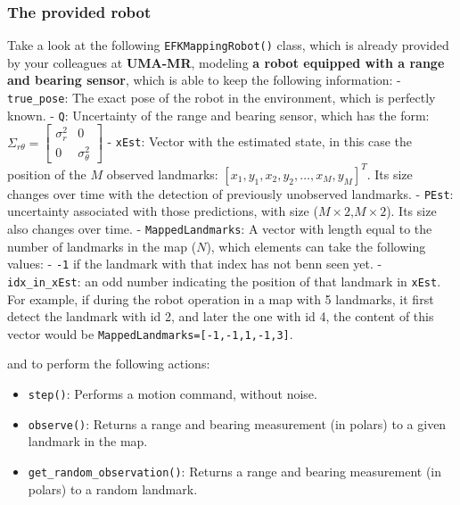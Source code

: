 \documentclass[11pt]{article}
\providecommand{\tightlist}{%
      \setlength{\itemsep}{0pt}\setlength{\parskip}{0pt}}
\begin{document}
    \hypertarget{the-provided-robot}{%
\subsubsection{The provided robot}\label{the-provided-robot}}

Take a look at the following \texttt{EFKMappingRobot()} class, which is
already provided by your colleagues at \textbf{{UMA-MR}}, modeling
\textbf{a robot equipped with a range and bearing sensor}, which is able
to keep the following information: - \texttt{true\_pose}: The exact pose
of the robot in the environment, which is perfectly known. - \texttt{Q}:
Uncertainty of the range and bearing sensor, which has the form:
\(\Sigma_{r\theta} = \begin{bmatrix} \sigma^2_r & 0 \\ 0 & \sigma^2_\theta \end{bmatrix}\)
- \texttt{xEst}: Vector with the estimated state, in this case the
position of the \(M\) observed landmarks:
\([x_1, y_1, x_2, y_2, \dots,x_M, y_M]^T\). Its size changes over time
with the detection of previously unobserved landmarks. - \texttt{PEst}:
uncertainty associated with those predictions, with size
(\(M\times2\),\(M\times2\)). Its size also changes over time. -
\texttt{MappedLandmarks}: A vector with length equal to the number of
landmarks in the map (\(N\)), which elements can take the following
values: - \texttt{-1} if the landmark with that index has not benn seen
yet. - \texttt{idx\_in\_xEst}: an odd number indicating the position of
that landmark in \texttt{xEst}. For example, if during the robot
operation in a map with 5 landmarks, it first detect the landmark with
id 2, and later the one with id 4, the content of this vector would be
\texttt{MappedLandmarks={[}-1,-1,1,-1,3{]}}.

and to perform the following actions:

\begin{itemize}
\tightlist
\item
  \texttt{step()}: Performs a motion command, without noise.
\item
  \texttt{observe()}: Returns a range and bearing measurement (in
  polars) to a given landmark in the map.
\item
  \texttt{get\_random\_observation()}: Returns a range and bearing
  measurement (in polars) to a random landmark.
\end{itemize}
\end{document}
